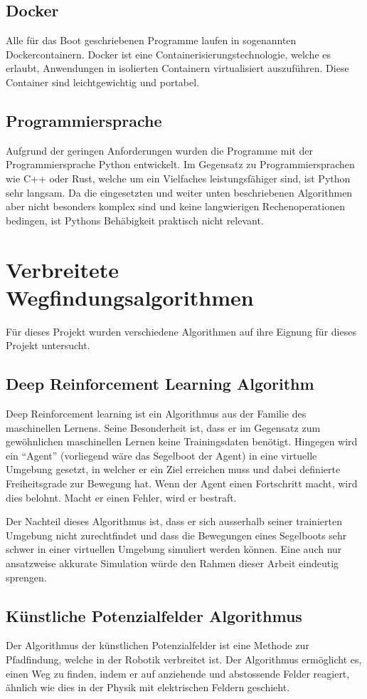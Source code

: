 \subsection*{Docker}
Alle für das Boot geschriebenen Programme laufen in sogenannten Dockercontainern. Docker ist eine Containerisierungstechnologie, welche es erlaubt, Anwendungen in isolierten Containern virtualisiert auszuführen. Diese Container sind leichtgewichtig und portabel.
\subsection*{Programmiersprache}
Aufgrund der geringen Anforderungen wurden die Programme mit der Programmiersprache Python entwickelt. Im Gegensatz zu Programmiersprachen wie C++ oder Rust, welche um ein Vielfaches leistungsfähiger sind, ist Python sehr langsam. Da die eingesetzten und weiter unten beschriebenen Algorithmen aber nicht besonders komplex sind und keine langwierigen Rechenoperationen bedingen, ist Pythons Behäbigkeit praktisch nicht relevant. 
\section{Verbreitete Wegfindungsalgorithmen}
Für dieses Projekt wurden verschiedene Algorithmen auf ihre Eignung für dieses Projekt untersucht.

\subsection{Deep Reinforcement Learning Algorithm }
Deep Reinforcement learning ist ein Algorithmus aus der Familie des maschinellen Lernens. Seine Besonderheit ist, dass er im Gegensatz zum gewöhnlichen maschinellen Lernen keine Trainingsdaten benötigt. Hingegen wird ein \enquote{Agent} (vorliegend wäre das Segelboot der Agent) in eine virtuelle Umgebung gesetzt, in welcher er ein Ziel erreichen muss und dabei definierte Freiheitsgrade zur Bewegung hat. Wenn der Agent einen Fortschritt macht, wird dies belohnt. Macht er einen Fehler, wird er bestraft.

Der Nachteil dieses Algorithmus ist, dass er sich ausserhalb seiner trainierten Umgebung nicht zurechtfindet und dass die Bewegungen eines Segelboots sehr schwer in einer virtuellen Umgebung simuliert werden können. Eine auch nur ansatzweise akkurate Simulation würde den Rahmen dieser Arbeit eindeutig sprengen.
\subsection{Künstliche Potenzialfelder Algorithmus} 
Der Algorithmus der künstlichen Potenzialfelder ist eine Methode zur Pfadfindung, welche in der Robotik verbreitet ist. Der Algorithmus ermöglicht es, einen Weg zu finden, indem er auf anziehende und abstossende Felder reagiert, ähnlich wie dies in der Physik mit elektrischen Feldern geschieht.

